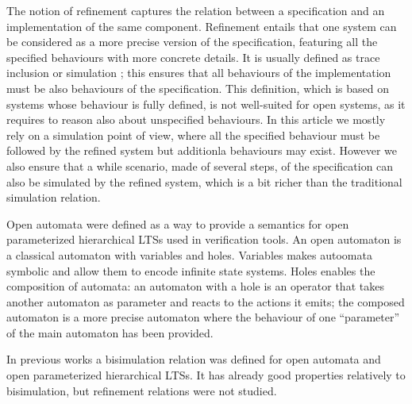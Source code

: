 \documentclass[runningheads]{llncs}
\begin{document}
The notion of refinement  captures the relation between  a specification and an implementation of the same component. Refinement entails that one system can be considered as a more precise version of the specification, featuring all the specified behaviours with more concrete details. 
 It is usually defined as trace inclusion or simulation  \cite{Milner:1980,Kouchnarenko:2007}; this ensures that all behaviours of the implementation must be also behaviours of the specification.
 This definition, which is based on systems whose behaviour is fully defined, is not well-suited for open systems,  as it requires to reason also about unspecified behaviours.
In this article we mostly rely on a simulation point of view, where all the specified behaviour must be followed by the refined system but additionla behaviours may exist. However we also ensure that a while scenario, made of several steps, of the specification can also be simulated by the refined system, which is a bit richer than the traditional simulation relation.



Open automata were defined as a way to provide a semantics for open parameterized hierarchical LTSs used in verification tools.
An open automaton \cite{henrio:01299562} is a classical automaton with variables and holes. Variables makes autoomata symbolic and allow them to encode infinite state systems. Holes enables the composition of automata: an automaton with a hole is an operator that takes another automaton as parameter and reacts to the actions it emits; the composed automaton is a more precise automaton where the behaviour of one ``parameter'' of the main automaton has been provided.

In previous works \cite{fhbisim,wang:03126313} a bisimulation relation was defined for open automata and open parameterized hierarchical LTSs. It has already good properties relatively to bisimulation, but refinement relations were not studied.
\end{document}
